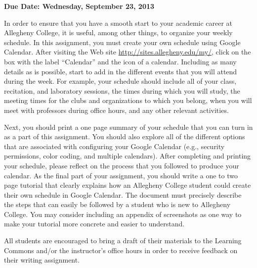 

\usepackage[compact]{titlesec}



\vspace*{-.2in}
\begin{center}
	{\bf Due Date: Wednesday, September 23, 2013}
\end{center}

In order to ensure that you have a smooth start to your academic career at Allegheny College, it is useful, among other
things, to organize your weekly schedule. In this assignment, you must create your own schedule using Google Calendar.
After visiting the Web site \url{http://sites.allegheny.edu/my/}, click on the box with the label ``Calendar'' and the
icon of a calendar. Including as many details as is possible, start to add in the different events that you will attend
during the week. For example, your schedule should include all of your class, recitation, and laboratory sessions, the
times during which you will study, the meeting times for the clubs and organizations to which you belong, when you will
meet with professors during office hours, and any other relevant activities.

Next, you should print a one page summary of your schedule that you can turn in as a part of this assignment. You should
also explore all of the different options that are associated with configuring your Google Calendar (e.g., security
permissions, color coding, and multiple calendars). After completing and printing your schedule, please reflect on the
process that you followed to produce your calendar. As the final part of your assignment, you should write a one to two
page tutorial that clearly explains how an Allegheny College student could create their own schedule in Google Calendar.
The document must precisely describe the steps that can easily be followed by a student who is new to Allegheny
College. You may consider including an appendix of screenshots as one way to make your tutorial more concrete and easier
to understand.

All students are encouraged to bring a draft of their materials to the Learning Commons and/or the instructor's office
hours in order to receive feedback on their writing assignment.



